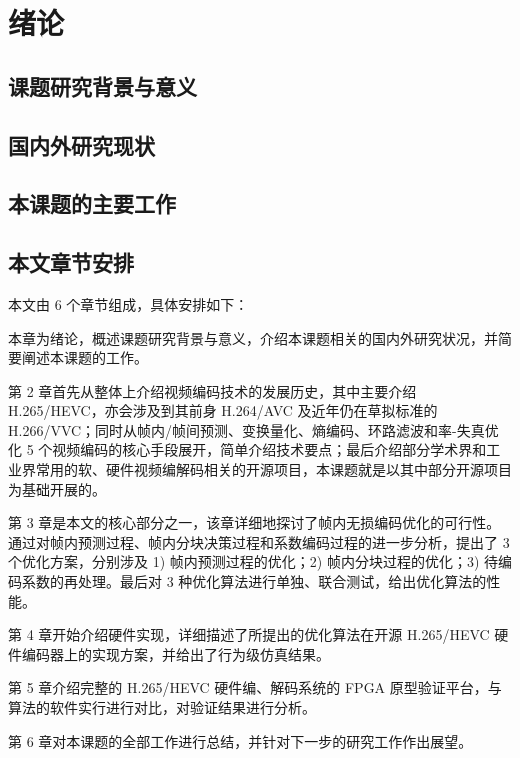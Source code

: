 \chapter{绪论}
\label{cha:c1}

\section{课题研究背景与意义}

\section{国内外研究现状}

\section{本课题的主要工作}
\cite{SAP-SAP1}
\section{本文章节安排}
本文由 6 个章节组成，具体安排如下：

本章为绪论，概述课题研究背景与意义，介绍本课题相关的国内外研究状况，并简要阐述本课题的工作。

第 2 章首先从整体上介绍视频编码技术的发展历史，其中主要介绍 H.265/HEVC，亦会涉及到其前身 H.264/AVC 及近年仍在草拟标准的 H.266/VVC；同时从帧内/帧间预测、变换量化、熵编码、环路滤波和率-失真优化 5 个视频编码的核心手段展开，简单介绍技术要点；最后介绍部分学术界和工业界常用的软、硬件视频编解码相关的开源项目，本课题就是以其中部分开源项目为基础开展的。

第 3 章是本文的核心部分之一，该章详细地探讨了帧内无损编码优化的可行性。通过对帧内预测过程、帧内分块决策过程和系数编码过程的进一步分析，提出了 3 个优化方案，分别涉及 1) 帧内预测过程的优化；2) 帧内分块过程的优化；3) 待编码系数的再处理。最后对 3 种优化算法进行单独、联合测试，给出优化算法的性能。

第 4 章开始介绍硬件实现，详细描述了所提出的优化算法在开源 H.265/HEVC 硬件编码器上的实现方案，并给出了行为级仿真结果。

第 5 章介绍完整的 H.265/HEVC 硬件编、解码系统的 FPGA 原型验证平台，与算法的软件实行进行对比，对验证结果进行分析。

第 6 章对本课题的全部工作进行总结，并针对下一步的研究工作作出展望。
